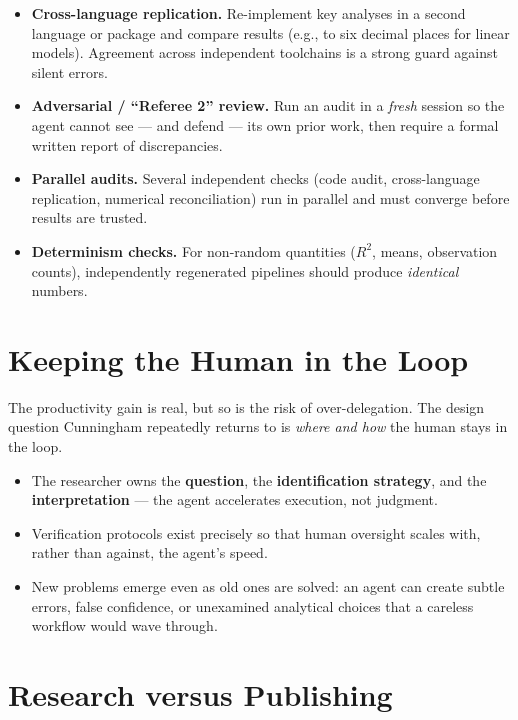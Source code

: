 \documentclass[11pt]{article}
\begin{document}
\begin{itemize}
  \item \textbf{Cross-language replication.} Re-implement key analyses in a
        second language or package and compare results (e.g., to six decimal
        places for linear models). Agreement across independent toolchains is a
        strong guard against silent errors.
  \item \textbf{Adversarial / ``Referee 2'' review.} Run an audit in a
        \emph{fresh} session so the agent cannot see --- and defend --- its own
        prior work, then require a formal written report of discrepancies.
  \item \textbf{Parallel audits.} Several independent checks (code audit,
        cross-language replication, numerical reconciliation) run in parallel
        and must converge before results are trusted.
  \item \textbf{Determinism checks.} For non-random quantities ($R^2$, means,
        observation counts), independently regenerated pipelines should produce
        \emph{identical} numbers.
\end{itemize}

\section{Keeping the Human in the Loop}

The productivity gain is real, but so is the risk of over-delegation. The design
question Cunningham repeatedly returns to is \emph{where and how} the human
stays in the loop.

\begin{itemize}
  \item The researcher owns the \textbf{question}, the \textbf{identification
        strategy}, and the \textbf{interpretation} --- the agent accelerates
        execution, not judgment.
  \item Verification protocols exist precisely so that human oversight scales
        with, rather than against, the agent's speed.
  \item New problems emerge even as old ones are solved: an agent can create
        subtle errors, false confidence, or unexamined analytical choices that
        a careless workflow would wave through.
\end{itemize}

\section{Research versus Publishing}
\end{document}
